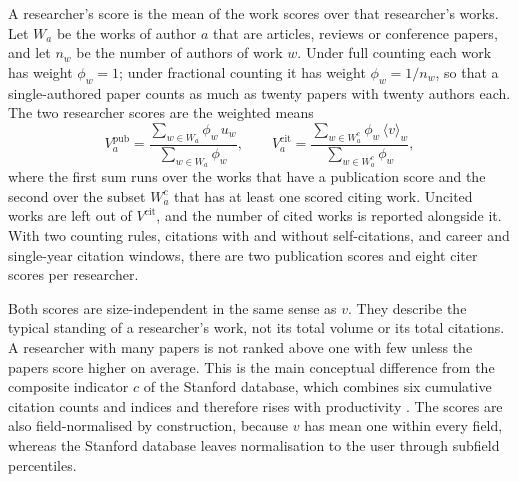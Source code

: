 A researcher's score is the mean of the work scores over that researcher's works. Let $W_a$ be the works of author $a$ that are articles, reviews or conference papers, and let $n_w$ be the number of authors of work $w$. Under full counting each work has weight $\phi_w = 1$; under fractional counting it has weight $\phi_w = 1/n_w$, so that a single-authored paper counts as much as twenty papers with twenty authors each. The two researcher scores are the weighted means
\begin{equation}
  V^{\mathrm{pub}}_a = \frac{\sum_{w \in W_a} \phi_w\, u_w}{\sum_{w \in W_a} \phi_w} , \qquad
  V^{\mathrm{cit}}_a = \frac{\sum_{w \in W_a^{c}} \phi_w\, \langle v \rangle_w}{\sum_{w \in W_a^{c}} \phi_w} ,
  \label{eq:author_v}
\end{equation}
where the first sum runs over the works that have a publication score and the second over the subset $W_a^{c}$ that has at least one scored citing work. Uncited works are left out of $V^{\mathrm{cit}}$, and the number of cited works is reported alongside it. With two counting rules, citations with and without self-citations, and career and single-year citation windows, there are two publication scores and eight citer scores per researcher.

Both scores are size-independent in the same sense as $v$. They describe the typical standing of a researcher's work, not its total volume or its total citations. A researcher with many papers is not ranked above one with few unless the papers score higher on average. This is the main conceptual difference from the composite indicator $c$ of the Stanford database, which combines six cumulative citation counts and indices and therefore rises with productivity \citep{ioannidisMultipleCitationIndicators2016}. The scores are also field-normalised by construction, because $v$ has mean one within every field, whereas the Stanford database leaves normalisation to the user through subfield percentiles.
